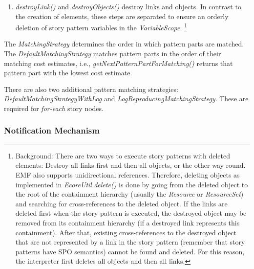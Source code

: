 \begin{enumerate}
	\item \emph{destroyLink()} and \emph{destroyObjects()} destroy links and objects. 
	In contrast to the creation of elements, these steps are separated to ensure an orderly deletion of story pattern variables in the \emph{VariableScope}.
	\footnote{Background: There are two ways to execute story patterns with deleted elements: Destroy all links first and then all objects, or the other way round. 
	EMF also supports unidirectional references. 
	Therefore, deleting objects as implemented in \emph{EcoreUtil.delete()} is done by going from the deleted object to the root of the containment hierarchy (usually the \emph{Resource} or \emph{ResourceSet}) and searching for cross-references to the deleted object. 
	If the links are deleted first when the story pattern is executed, the destroyed object may be removed from its containment hierarchy (if a destroyed link represents this containment). 
	After that, existing cross-references to the destroyed object that are not represented by a link in the story pattern (remember that story patterns have SPO semantics) cannot be found and deleted. 
	For this reason, the interpreter first deletes all objects and then all links.}
	

\end{enumerate}


The \emph{MatchingStrategy} determines the order in which pattern parts are matched. 
The \emph{DefaultMatchingStrategy} matches pattern parts in the order of their matching cost estimates, i.e., \emph{getNextPatternPartForMatching()} returns that pattern part with the lowest cost estimate. 

There are also two additional pattern matching strategies: \emph{DefaultMatchingStrategyWithLog} and \emph{LogReproducingMatchingStrategy}. 
These are required for \emph{for-each} story nodes. 

\subsubsection{Notification Mechanism}
\label{sec:notification_mechanism}

